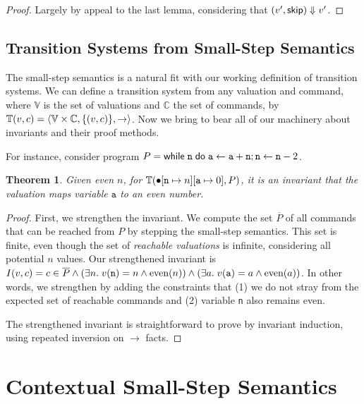 \documentclass{amsbook}
\newtheorem{theorem}{Theorem}[chapter]
\theoremstyle{definition}
\theoremstyle{remark}
\numberwithin{section}{chapter}
\numberwithin{equation}{chapter}
\begin{document}
\begin{proof}
  Largely by appeal to the last lemma, considering that $(v', \mathsf{skip}) \Downarrow v'$.
\end{proof}

\subsection{Transition Systems from Small-Step Semantics}

The small-step semantics is a natural fit with our working definition of transition systems.
We can define a transition system from any valuation and command, where $\mathbb V$ is the set of valuations and $\mathbb C$ the set of commands, by $\mathbb T(v, c) = {\left \langle \mathbb V \times \mathbb C, \{(v, c)\}, \to \right \rangle}$.
Now we bring to bear all of our machinery about invariants and their proof methods.

For instance, consider program $P = \mathsf{while} \; \mathtt{n} \; \mathsf{do} \; \mathtt{a} \leftarrow \mathtt{a} + \mathtt{n}; \mathtt{n} \leftarrow \mathtt{n} - 2$.

\invariants
\begin{theorem}
  Given even $n$, for $\mathbb T(\bullet[\mathtt{n} \mapsto n][\mathtt{a} \mapsto 0], P)$, it is an invariant that the valuation maps variable $\mathtt{a}$ to an even number.
\end{theorem}

\begin{proof}
  First, we strengthen the invariant.
  We compute the set $\overline{P}$ of all commands that can be reached from $P$ by stepping the small-step semantics.
  This set is finite, even though the set of \emph{reachable valuations} is infinite, considering all potential $n$ values.
  Our strengthened invariant is $I(v, c) = c \in \overline{P} \land (\exists n. \; v(\mathtt{n}) = n \land \textrm{even}(n)) \land (\exists a. \; v(\mathtt{a}) = a \land \textrm{even}(a))$.
  In other words, we strengthen by adding the constraints that (1) we do not stray from the expected set of reachable commands and (2) variable \texttt{n} also remains even.

  The strengthened invariant is straightforward to prove by invariant induction, using repeated inversion on $\to$ facts.
\end{proof}


\section{Contextual Small-Step Semantics}
\end{document}
